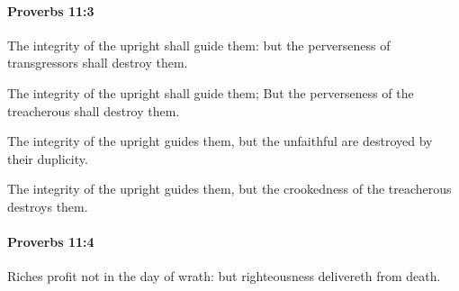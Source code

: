 		\paragraph{Proverbs 11:3} %
			\label{PROVERBS-11-3}

			The integrity of the upright shall guide them: but the perverseness of transgressors shall destroy them.

			\begin{versebox}
					\item[BHS] 
					\item[ASV] The integrity of the upright shall guide them; But the perverseness of the treacherous shall destroy them.
					\item[NIV] The integrity of the upright guides them, but the unfaithful are destroyed by their duplicity.
					\item[NRSV] The integrity of the upright guides them, but the crookedness of the treacherous destroys them.
			\end{versebox}

		\paragraph{Proverbs 11:4} %
			\label{PROVERBS-11-4}

			Riches profit not in the day of wrath: but righteousness delivereth from death.

